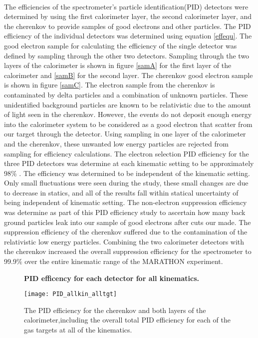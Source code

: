 \paragraph{}The efficiencies of the spectrometer's particle identification(PID) detectors were determined by using the first calorimeter layer, the second calorimeter layer, and the cherenkov to provide samples of good electrons and other particles. The PID efficiency of the individual detectors was determined using equation \ref{effequ}. The good electron sample for calculating the efficiency of the single detector was defined by sampling through the other two detectors. Sampling through the two layers of the calorimeter is shown in figure \ref{samA} for the first layer of the calorimeter and \ref{samB} for the second layer. The cherenkov good electron sample is shown in figure \ref{samC}. The electron sample from the cherenkov is contaminated by delta particles and a combination of unknown particles. These unidentified background particles are known to be relativistic due to the amount of light seen in the cherenkov. However, the events do not deposit enough energy into the calorimeter system to be considered as a good electron that scatter from our target through the detector. Using sampling in one layer of the calorimeter and the cherenkov, these unwanted low energy particles are rejected from sampling for efficiency calculations. The electron selection PID efficiency for the three PID detectors was determine at each kinematic setting to be approximately 98$\%$ . The efficiency was determined to be independent of the kinematic setting. Only small fluctuations were seen during the study, these small changes are due to decrease in statics, and all of the results fall within statical uncertainty of being independent of kinematic setting. The non-electron suppression efficiency was determine as part of this PID efficiency study to ascertain how many back ground particles leak into our sample of good electrons after cuts our made. The suppression efficiency of the cherenkov suffered due to the contamination of the relativistic low energy particles. Combining the two calorimeter detectors with the cherenkov increased the overall suppression efficiency for the spectrometer to 99.9$\%$ over the entire kinematic range of the MARATHON experiment. 

\begin{figure}[t]
	{\centering
		\textbf{PID efficency for each detector for all kinematics. }\par\medskip}
	\centering
	\texttt{[image: PID\_allkin\_alltgt]}
	\caption{The PID efficiency for the cherenkov and both layers of the calorimeter,including the overall total PID efficiency for each of the gas targets at all of the kinematics.}
\end{figure}

